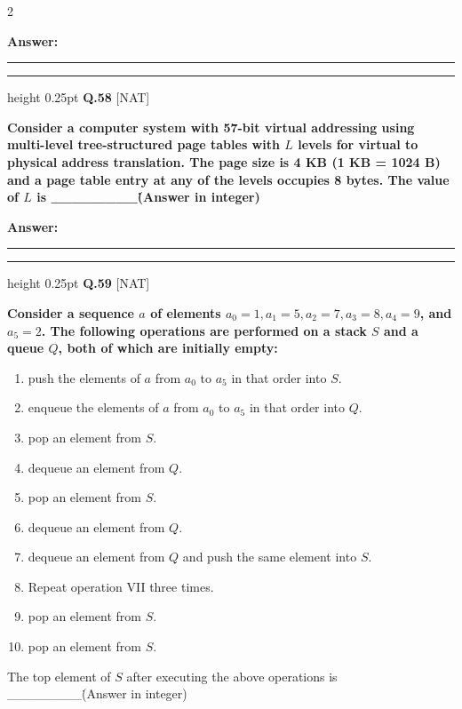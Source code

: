 \documentclass[a4paper,10pt,twoside]{article}
\begin{document}
\begin{multicols}{2}
\par\vspace{3pt}\noindent\textbf{Answer:} \rule{3.2cm}{0.4pt}
\par\vspace{6pt}\hrule height 0.25pt\vspace{6pt}
\noindent\textbf{Q.58} \hfill {\footnotesize\textsf{[NAT]}}
\par\vspace{2pt}
{\bfseries Consider a computer system with 57-bit virtual addressing using multi-level tree-structured page tables with $L$ levels for virtual to physical address translation. The page size is 4 KB (1 KB = 1024 B) and a page table entry at any of the levels occupies 8 bytes.
The value of $L$ is \_\_\_\_\_\_\_\_\. (Answer in integer) \par}
\par\vspace{3pt}\noindent\textbf{Answer:} \rule{3.2cm}{0.4pt}
\par\vspace{6pt}\hrule height 0.25pt\vspace{6pt}
\noindent\textbf{Q.59} \hfill {\footnotesize\textsf{[NAT]}}
\par\vspace{2pt}
{\bfseries Consider a sequence $a$ of elements $a_0 = 1, a_1 = 5, a_2 = 7, a_3 = 8, a_4 = 9$, and $a_5 = 2$. The following operations are performed on a stack $S$ and a queue $Q$, both of which are initially empty:
\begin{enumerate}[label=\Roman*.,itemsep=0pt,topsep=2pt]
\item push the elements of $a$ from $a_0$ to $a_5$ in that order into $S$.
\item enqueue the elements of $a$ from $a_0$ to $a_5$ in that order into $Q$.
\item pop an element from $S$.
\item dequeue an element from $Q$.
\item pop an element from $S$.
\item dequeue an element from $Q$.
\item dequeue an element from $Q$ and push the same element into $S$.
\item Repeat operation VII three times.
\item pop an element from $S$.
\item pop an element from $S$.
\end{enumerate}
The top element of $S$ after executing the above operations is \_\_\_\_\_\_\_\_\. (Answer in integer) \par}

\end{multicols}
\end{document}
